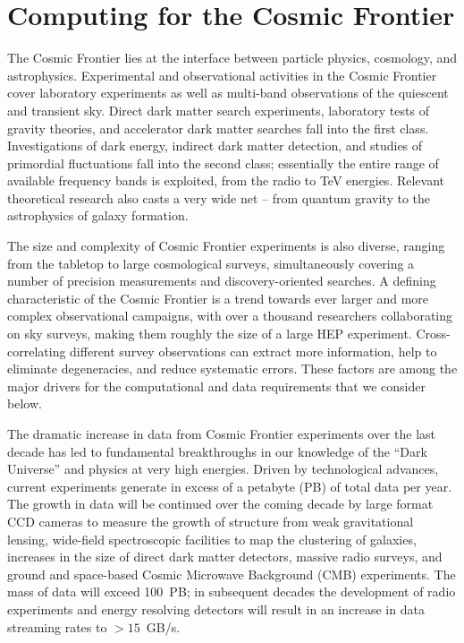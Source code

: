  
\section{Computing for the Cosmic Frontier}

The Cosmic Frontier lies at the interface between particle physics,
cosmology, and astrophysics. Experimental and observational activities
in the Cosmic Frontier cover laboratory experiments as well as
multi-band observations of the quiescent and transient sky. Direct
dark matter search experiments, laboratory tests of gravity theories,
and accelerator dark matter searches fall into the first
class. Investigations of dark energy, indirect dark matter detection,
and studies of primordial fluctuations fall into the second class;
essentially the entire range of available frequency bands is
exploited, from the radio to TeV energies. Relevant theoretical
research also casts a very wide net -- from quantum gravity to the
astrophysics of galaxy formation.

The size and complexity of Cosmic Frontier experiments is also
diverse, ranging from the tabletop to large cosmological surveys,
simultaneously covering a number of precision measurements and
discovery-oriented searches. A defining characteristic of the Cosmic
Frontier is a trend towards ever larger and more complex observational
campaigns, with over a thousand researchers collaborating on sky
surveys, making them roughly the size of a large HEP
experiment. Cross-correlating different survey observations can
extract more information, help to eliminate degeneracies, and reduce
systematic errors. These factors are among the major drivers for the
computational and data requirements that we consider below.

The dramatic increase in data from Cosmic Frontier experiments over
the last decade has led to fundamental breakthroughs in our knowledge
of the ``Dark Universe'' and physics at very high energies. Driven by
technological advances, current experiments generate in excess of a
petabyte (PB) of total data per year. The growth in data will be
continued over the coming decade by large format CCD cameras to
measure the growth of structure from weak gravitational lensing,
wide-field spectroscopic facilities to map the clustering of galaxies,
increases in the size of direct dark matter detectors, massive radio
surveys, and ground and space-based Cosmic Microwave Background (CMB)
experiments. The mass of data will exceed 100~PB; in subsequent decades
the development of radio experiments and energy resolving detectors
will result in an increase in data streaming rates to $> 15$~GB/s.

